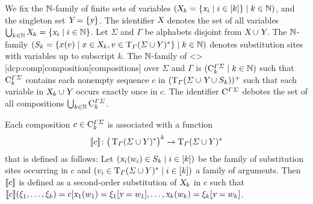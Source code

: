 \documentclass[../../document.tex]{subfiles}
\begin{document}
    \begin{definition}[Composition]
        We fix the \(\mathbb{N}\)-family of finite sets of variables \((\textsl{X}_k = \{\textsl{x}_i \mid i \in [k]\} \mid k \in \mathbb{N})\), and the singleton set \(\textsl{Y} = \{\textsl{y}\}\).
        The identifier \(\textsl{X}\) denotes the set of all variables \(\bigcup_{k \in \mathbb{N}} \textsl{X}_k = \{\textsl{x}_i \mid i \in \mathbb{N}\}\).
        Let \(\varSigma\) and \(\varGamma\) be alphabets disjoint from \(\textsl{X} \cup \textsl{Y}\).
        The \(\mathbb{N}\)-family \((S_k = \{x(v) \mid x \in \textsl{X}_k, v \in \operatorname{T}_\varGamma(\varSigma \cup Y)^*\} \mid k \in \mathbb{N})\) denotes substitution sites with variables up to subscript \(k\).
        The \(\mathbb{N}\)-family of  <\dcp>[dcp:comp]{composition}[compositions] over \(\varSigma\) and \(\varGamma\) is \((\mathrm{C}^{\varGamma\varSigma}_k \mid k \in \mathbb{N})\) such that \(\mathrm{C}^{\varGamma\varSigma}_k\) contains each nonempty sequence \(c\) in \((\operatorname{T}_\varGamma(\varSigma \cup \textsl{Y} \cup S_k))^+\) such that each variable in \(\textsl{X}_k \cup \textsl{Y}\) occurs exactly once in \(c\).
        The identifier \(\mathrm{C}^{\varGamma\varSigma}\) debotes the set of all  compositions \(\bigcup_{k \in \mathbb{N}} \mathrm{C}^{\varGamma\varSigma}_{k}\).

        Each composition \(c \in \mathrm{C}^{\varGamma\varSigma}_k\) is associated with a function \[
            \llbracket c\rrbracket\colon \big(\operatorname{T}_\varGamma(\varSigma \cup Y)^*\big)^k \to \operatorname{T}_\varGamma(\varSigma \cup Y)^*
        \] that is defined as follows:
            Let \((\textsl{x}_i(w_i) \in S_k \mid i \in [k])\) be the family of substitution sites occurring in \(c\) and \((v_i \in \operatorname{T}_\varGamma(\varSigma \cup Y)^* \mid i \in [k])\) a family of arguments.
            Then \(\llbracket c\rrbracket\) is defined as a second-order substitution of \(\textsl{X}_k\) in \(c\) such that \(\llbracket c\rrbracket(\xi_1, \ldots, \xi_k) = c[\textsl{x}_1(w_1)=\xi_1[\textsl{y}=w_1], \ldots, \textsl{x}_k(w_k)=\xi_k[\textsl{y}=w_k]\).
    \end{definition}

\end{document}

